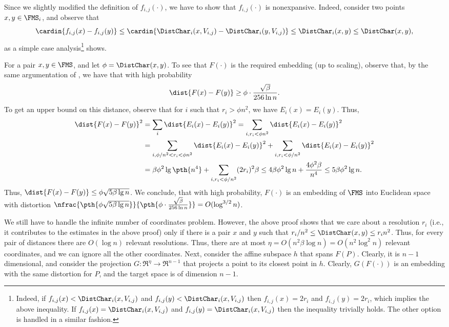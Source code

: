Since we slightly modified the definition of $f_{i,j}(\cdot)$, we have
to show that $f_{i,j}(\cdot)$ is nonexpansive. Indeed, consider two
points $x,y \in \FMS_i$, and observe that
\begin{equation*}
\cardin{f_{i,j}(x) - f_{i,j}(y) } \leq \cardin{\DistChar_i(x, V_{i,j}) - 
\DistChar_i(y, V_{i,j})} \leq \DistChar_i(x,y) \leq  \DistChar(x,y),
\end{equation*}
as a simple case analysis\footnote{Indeed, if
   $f_{i,j}(x) < \DistChar_i(x, V_{i,j})$ and
   $f_{i,j}(y) < \DistChar_i(x, V_{i,j})$ then $f_{i,j}(x) = 2 r_i$
   and $f_{i,j}(y) = 2 r_i$, which implies the above inequality.  If
   $f_{i,j}(x) = \DistChar_i(x, V_{i,j})$ and
   $f_{i,j}(y) = \DistChar_i(x, V_{i,j})$ then the inequality
   trivially holds. The other option is handled in a similar fashion.}
shows.



For a pair $x,y \in \FMS$, and let $\phi =\DistChar(x,y)$.  To see that
$F(\cdot)$ is the required embedding (up to scaling), observe that, by
the same argumentation of , we have that
with high probability 
\begin{equation*}
    \dist{F(x)- F(y)} \geq \phi \cdot \frac{\sqrt{\beta}}{256 \ln n}.
\end{equation*}
To get an upper bound on this distance, observe that for $i$ such that
$r_i > \phi n^2$, we have $E_i(x) = E_i(y)$. Thus,
\begin{align*}
  \dist{F(x) - F(y)}^2%
  &=%
    \sum_i \dist{E_i(x) - E_i(y)}^2 = \sum_{i, r_i <
    \phi n^2} \dist{E_i(x) - E_i(y)}^2\\
  &=%
    \sum_{i, \phi/n^2 < r_i < \phi
    n^2 } \dist{E_i(x) - E_i(y)}^2 + \sum_{i, r_i < \phi/ n^2 }
    \dist{E_i(x) - E_i(y)}^2 \\
  &=%
    \beta \phi^2 \lg \pth{n^4} +
    \sum_{i, r_i < \phi/n^2} (2r_i)^2 \beta
    \leq 4\beta \phi^2 \lg n + \frac{4\phi^2\beta}{n^4 }
    \leq 5\beta \phi^2 \lg n.
\end{align*}
Thus, $\dist{F(x) - F(y)} \leq \phi \sqrt{5 \beta \lg n}$. We conclude,
that with high probability, $F(\cdot)$ is an embedding of $\FMS$ into
Euclidean space with distortion $\nfrac{\pth{\phi \sqrt{5 \beta \lg
         n}}}{\pth{\phi \cdot \frac{\sqrt{\beta}}{256 \ln n}}} = O(
\log^{3/2} n)$. 

We still have to handle the infinite number of coordinates problem.
However, the above proof shows that we care about a resolution $r_i$
(i.e., it contributes to the estimates in the above proof) only if
there is a pair $x$ and $y$ such that $r_i/n^2 \leq \DistChar(x,y) \leq r_i
n^2$. Thus, for every pair of distances there are $O( \log n)$
relevant resolutions. Thus, there are at most $\eta = O(n^2 \beta \log
n) = O(n^2 \log^2 n)$ relevant coordinates, and we can ignore all the
other coordinates. Next, consider the affine subspace $h$ that spans
$F(P)$. Clearly, it is $n-1$ dimensional, and consider the projection
$G:\Re^\eta \rightarrow \Re^{n-1}$ that projects a point to its
closest point in $h$. Clearly, $G(F(\cdot))$ is an embedding with the
same distortion for $P$, and the target space is of dimension
$n-1$. 

